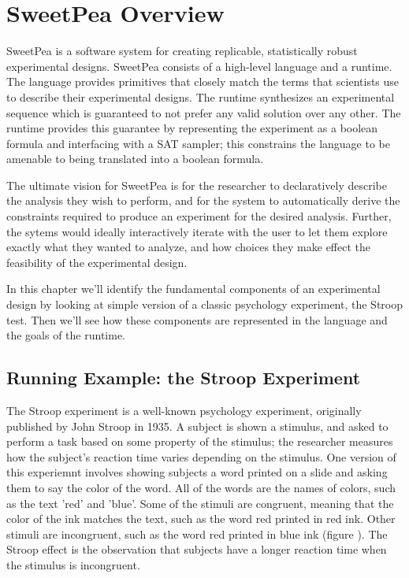 
\chapter{SweetPea Overview}


SweetPea is a software system for creating replicable, statistically robust experimental designs. SweetPea consists of a high-level language and a runtime. The language provides primitives that closely match the terms that scientists use to describe their experimental designs. The runtime synthesizes an experimental sequence which is guaranteed to not prefer any valid solution over any other. The runtime provides this guarantee by representing the experiment as a boolean formula and interfacing with a SAT sampler; this constrains the language to be amenable to being translated into a boolean formula.

The ultimate vision for SweetPea is for the researcher to declaratively describe the analysis they wish to perform, and for the system to automatically derive the constraints required to produce an experiment for the desired analysis. Further, the sytems would ideally interactively iterate with the user to let them explore exactly what they wanted to analyze, and how choices they make effect the feasibility of the experimental design.

In this chapter we'll identify the fundamental components of an experimental design by looking at simple version of a classic psychology experiment, the Stroop test. Then we'll see how these components are represented in the language and the goals of the runtime.

\section{Running Example: the Stroop Experiment}

The Stroop experiment is a well-known psychology experiment, originally published by John Stroop in 1935. A subject is shown a stimulus, and asked to perform a task based on some property of the stimulus; the researcher measures how the subject's reaction time varies depending on the stimulus. One version of this experiemnt involves showing subjects a word printed on a slide and asking them to say the color of the word. All of the words are the names of colors, such as the text 'red' and 'blue'. Some of the stimuli are congruent, meaning that the color of the ink matches the text, such as the word red printed in red ink. Other stimuli are incongruent, such as the word red printed in blue ink (figure ). The Stroop effect is the observation that subjects have a longer reaction time when the stimulus is incongruent.

